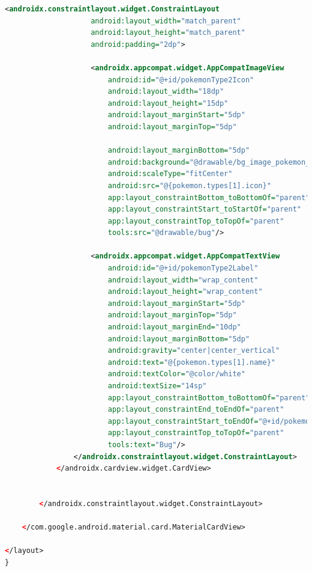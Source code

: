 \documentclass[a4paper, 12pt]{article}
\begin{document}
\begin{lstlisting}[caption={Binding property Region.}, label={code:binding_region_code}, language=XML]
                <androidx.constraintlayout.widget.ConstraintLayout
                    android:layout_width="match_parent"
                    android:layout_height="match_parent"
                    android:padding="2dp">

                    <androidx.appcompat.widget.AppCompatImageView
                        android:id="@+id/pokemonType2Icon"
                        android:layout_width="18dp"
                        android:layout_height="15dp"
                        android:layout_marginStart="5dp"
                        android:layout_marginTop="5dp"

                        android:layout_marginBottom="5dp"
                        android:background="@drawable/bg_image_pokemon_type"
                        android:scaleType="fitCenter"
                        android:src="@{pokemon.types[1].icon}"
                        app:layout_constraintBottom_toBottomOf="parent"
                        app:layout_constraintStart_toStartOf="parent"
                        app:layout_constraintTop_toTopOf="parent"
                        tools:src="@drawable/bug"/>

                    <androidx.appcompat.widget.AppCompatTextView
                        android:id="@+id/pokemonType2Label"
                        android:layout_width="wrap_content"
                        android:layout_height="wrap_content"
                        android:layout_marginStart="5dp"
                        android:layout_marginTop="5dp"
                        android:layout_marginEnd="10dp"
                        android:layout_marginBottom="5dp"
                        android:gravity="center|center_vertical"
                        android:text="@{pokemon.types[1].name}"
                        android:textColor="@color/white"
                        android:textSize="14sp"
                        app:layout_constraintBottom_toBottomOf="parent"
                        app:layout_constraintEnd_toEndOf="parent"
                        app:layout_constraintStart_toEndOf="@+id/pokemonType2Icon"
                        app:layout_constraintTop_toTopOf="parent"
                        tools:text="Bug"/>
                </androidx.constraintlayout.widget.ConstraintLayout>
            </androidx.cardview.widget.CardView>


        </androidx.constraintlayout.widget.ConstraintLayout>

    </com.google.android.material.card.MaterialCardView>

</layout>
}
\end{lstlisting}
\end{document}
